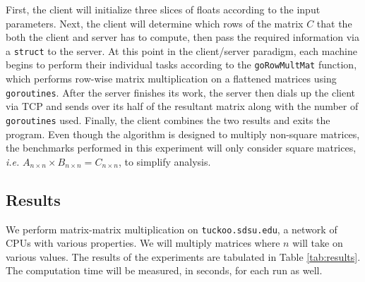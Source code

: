\documentclass[12pt]{article}
\begin{document}
			First, the client will initialize three slices of floats according to the input parameters. Next, the client will determine which rows of the matrix $C$ that the both the client and server has to compute, then pass the required information via a \texttt{struct} to the server. At this point in the client/server paradigm, each machine begins to perform their individual tasks according to the \texttt{goRowMultMat} function, which performs row-wise matrix multiplication on a flattened matrices using \texttt{goroutines}. After the server finishes its work, the server then dials up the client via TCP and sends over its half of the resultant matrix along with the number of \texttt{goroutines} used. Finally, the client combines the two results and exits the program. Even though the algorithm is designed to multiply non-square matrices, the benchmarks performed in this experiment will only consider square matrices, \textit{i.e.} $A_{n\times n}\times B_{n\times n}=C_{n\times n}$, to simplify analysis.
			
		\subsection*{Results}
			We perform matrix-matrix multiplication on \texttt{tuckoo.sdsu.edu}, a network of CPUs with various properties. We will multiply matrices where $n$ will take on various values. The results of the experiments are tabulated in Table \ref{tab:results}. The computation time will be measured, in seconds, for each run as well.
			
\end{document}
